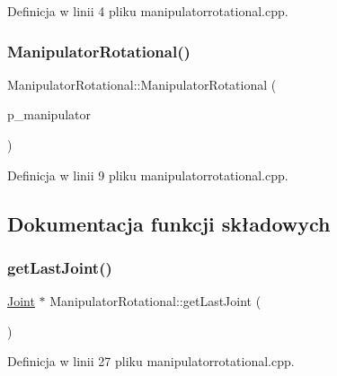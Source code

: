 Definicja w linii 4 pliku manipulatorrotational.\+cpp.

\mbox{\label{class_manipulator_rotational_acb63f74aed0760ae5cdef17da2369e05}} 
\subsubsection{\texorpdfstring{Manipulator\+Rotational()}{ManipulatorRotational()}\hspace{0.1cm}{\footnotesize\ttfamily [2/2]}}
{\footnotesize\ttfamily Manipulator\+Rotational\+::\+Manipulator\+Rotational (\begin{DoxyParamCaption}\item[{const \hyperlink{class_manipulator_rotational}{Manipulator\+Rotational} \&}]{p\+\_\+manipulator }\end{DoxyParamCaption})}



Definicja w linii 9 pliku manipulatorrotational.\+cpp.



\subsection{Dokumentacja funkcji składowych}
\mbox{\label{class_manipulator_rotational_a568eefeea1d7f4748655d3682e738ad5}} 
\subsubsection{\texorpdfstring{get\+Last\+Joint()}{getLastJoint()}}
{\footnotesize\ttfamily \hyperlink{class_joint}{Joint} $\ast$ Manipulator\+Rotational\+::get\+Last\+Joint (\begin{DoxyParamCaption}{ }\end{DoxyParamCaption})}



Definicja w linii 27 pliku manipulatorrotational.\+cpp.

\mbox{\label{class_manipulator_rotational_a1e2783e274696df660858293feb76ede}} 
